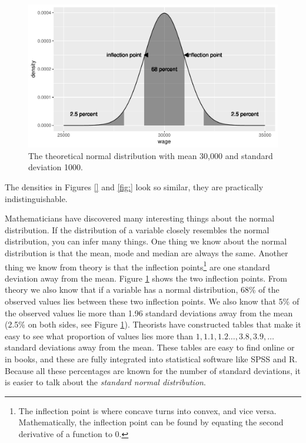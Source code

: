 \documentclass[]{book}\usepackage[]{graphicx}\usepackage[]{color}
\makeatletter
\def\maxwidth{ %
  \ifdim\Gin@nat@width>\linewidth
    \linewidth
  \else
    \Gin@nat@width
  \fi
}
\newenvironment{knitrout}{}{} %
\makeatother
\begin{document}
\begin{knitrout}
\color{fgcolor}\begin{figure}

{\centering \includegraphics[width=\maxwidth]{figure/distr_4-1} 

}

\caption[The theoretical normal distribution with mean 30,000 and standard deviation 1000]{The theoretical normal distribution with mean 30,000 and standard deviation 1000.}\label{fig:distr_4}
\end{figure}


\end{knitrout}

The densities in Figures \ref{} and \ref{fig:} look so similar, they are practically indistinguishable.

Mathematicians have discovered many interesting things about the normal distribution. If the distribution of a variable closely resembles the normal distribution, you can infer many things. One thing we know about the normal distribution is that the mean, mode and median are always the same. Another thing we know from theory is that the inflection points\footnote{The inflection point is where concave turns into convex, and vice versa. Mathematically, the inflection point can be found by equating the second derivative of a function to 0.} are one standard deviation away from the mean.  Figure \ref{fig:distr_4} shows the two inflection points. From theory we also know that if a variable has a normal distribution, 68\% of the observed values lies between these two inflection points. We also know that 5\% of the observed values lie more than 1.96 standard deviations away from the mean (2.5\% on both sides, see Figure \ref{fig:distr_4}). Theorists have constructed tables that make it easy to see what proportion of values lies more than $1, 1.1, 1.2 \dots, 3.8, 3.9, \dots$ standard deviations away from the mean. These tables are easy to find online or in books, and these are fully integrated into statistical software like SPSS and R. Because all these percentages are known for the number of standard deviations, it is easier to talk about the \textit{standard normal distribution}.
\end{document}
